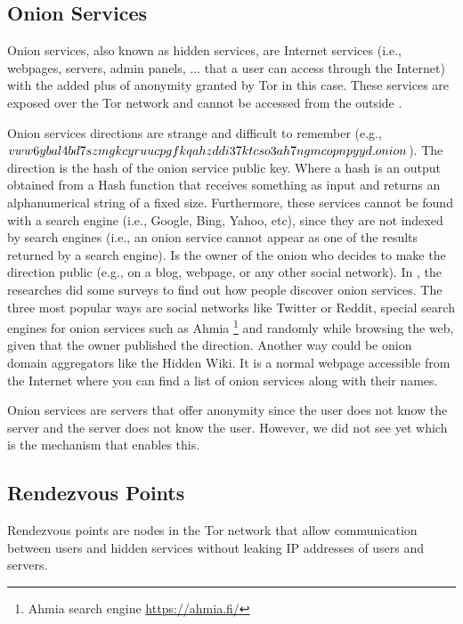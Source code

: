 \documentclass[11pt, a4paper,twoside]{tesi_upf}
\begin{document}
\subsection{Onion Services} \label{onion-service-section}

Onion services, also known as hidden services, are Internet services (i.e., webpages, servers, admin panels, ... that a user can access through the Internet) with the added plus of anonymity granted by Tor in this case. These services are exposed over the Tor network and cannot be accessed from the outside \cite{onion-services-tor}.

Onion services directions are strange and difficult to remember (e.g., $vww6ybal4bd7szmgk\\cyruucpgfkqahzddi37ktcso3ah7ngmcopnpyyd.onion$). The direction is the hash of the onion service public key. Where a hash is an output obtained from a Hash function that receives something as input and returns an alphanumerical string of a fixed size. Furthermore, these services cannot be found with a search engine (i.e., Google, Bing, Yahoo, etc), since they are not indexed by search engines (i.e., an onion service cannot appear as one of the results returned by a search engine). Is the owner of the onion who decides to make the direction public (e.g., on a blog, webpage, or any other social network).
In \cite{onion-services-tor}, the researches did some surveys to find out how people discover onion services. The three most popular ways are social networks like Twitter or Reddit, special search engines for onion services such as Ahmia \footnote{Ahmia search engine \url{https://ahmia.fi/}} and randomly while browsing the web, given that the owner published the direction. Another way could be onion domain aggregators like the Hidden Wiki. It is a normal webpage accessible from the Internet where you can find a list of onion services along with their names.

Onion services are servers that offer anonymity since the user does not know the server and the server does not know the user. However, we did not see yet which is the mechanism that enables this.

\subsection{Rendezvous Points}

Rendezvous points are nodes in the Tor network that allow communication between users and hidden services without leaking IP addresses of users and servers.
\end{document}
